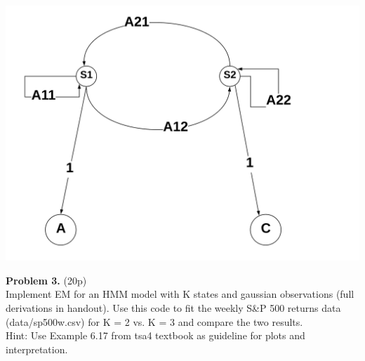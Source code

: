 \documentclass[12pt]{article}
\begin{document}
\begin{center}
	\includegraphics[width=1\linewidth]{figures/problem-2-1.png} 
\end{center}


\noindent \textbf{Problem 3.}  (20p)\\ 
Implement EM for an HMM model with K states and gaussian observations (full derivations in handout). 
Use this code to fit the weekly S\&P 500 returns data (data/sp500w.csv) for K = 2 vs. K = 3 and compare the two results. \\
Hint: Use Example 6.17 from tsa4 textbook as guideline for plots and interpretation.
\end{document}
